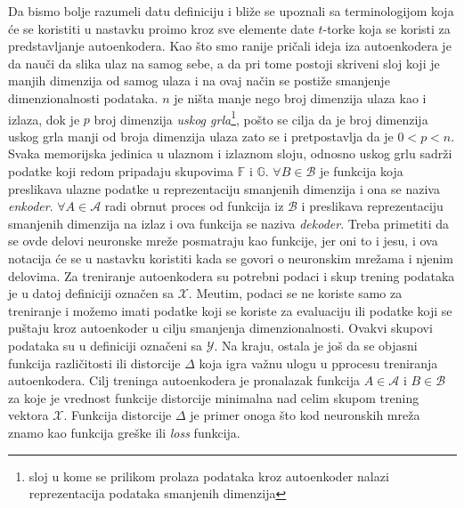 \documentclass{article}
\begin{document}
	Da bismo bolje razumeli datu definiciju i bli\v ze se upoznali sa terminologijom koja \'ce se koristiti u nastavku pro\dj imo kroz sve elemente date $t$-torke koja se koristi za predstavljanje autoenkodera. 
	Kao \v sto smo ranije pri\v cali ideja iza autoenkodera je da nau\v ci da slika ulaz na samog sebe, a da pri tome postoji skriveni sloj koji je manjih dimenzija od samog ulaza i na ovaj na\v cin se posti\v ze smanjenje dimenzionalnosti podataka.
	$n$ je ni\v sta manje nego broj dimenzija ulaza kao i izlaza, dok je $p$ broj dimenzija \emph{uskog grla}\footnote{sloj u kome se prilikom prolaza podataka kroz autoenkoder nalazi reprezentacija podataka smanjenih dimenzija}, po\v sto se cilja da je broj dimenzija uskog grla manji od broja dimenzija ulaza zato se i pretpostavlja da je $0 < p < n$. 
	Svaka memorijska jedinica u ulaznom i izlaznom sloju, odnosno uskog grlu sadr\v zi podatke koji redom pripadaju skupovima $\mathbb{F}$ i $\mathbb{G}$. $\forall B \in \mathcal{B}$ je funkcija koja preslikava ulazne podatke u reprezentaciju smanjenih dimenzija i ona se naziva \emph{enkoder}. $\forall A \in \mathcal{A}$ radi obrnut proces od funkcija iz $\mathcal{B}$ i preslikava reprezentaciju smanjenih dimenzija na izlaz i ova funkcija se naziva \emph{dekoder}.
	Treba primetiti da se ovde delovi neuronske mre\v ze posmatraju kao funkcije, jer oni to i jesu, i ova notacija \'ce se u nastavku koristiti kada se govori o neuronskim mre\v zama i njenim delovima.
	Za treniranje autoenkodera su potrebni podaci i skup trening podataka je u datoj definiciji ozna\v cen sa $\mathcal{X}$.
	Me\dj utim, podaci se ne koriste samo za treniranje i mo\v zemo imati podatke koji se koriste za evaluaciju ili podatke koji se pu\v staju kroz autoenkoder u cilju smanjenja dimenzionalnosti. 
	Ovakvi skupovi podataka su u definiciji ozna\v ceni sa $\mathcal{Y}$. Na kraju, ostala je jo\v s da se objasni funkcija razli\v citosti ili distorcije $\Delta$ koja igra va\v znu ulogu u pprocesu treniranja autoenkodera.
	Cilj treninga autoenkodera je pronalazak funkcija $A \in \mathcal{A}$ i $B \in \mathcal{B}$ za koje je vrednost funkcije distorcije minimalna nad celim skupom trening vektora $\mathcal{X}$. 
	Funkcija distorcije $\Delta$ je primer onoga \v sto kod neuronskih mre\v za znamo kao funkcija gre\v ske ili \emph{loss} funkcija.
	
\end{document}
